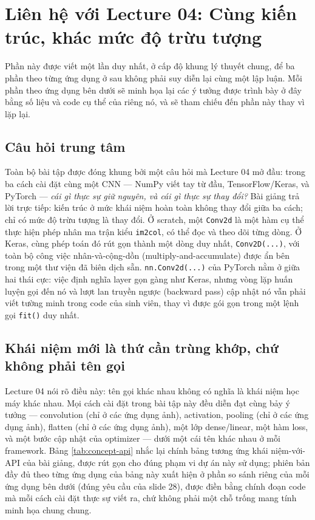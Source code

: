 \documentclass[11pt]{article}
\newcommand{\code}[1]{\texttt{#1}}
\begin{document}
\section{Liên hệ với Lecture 04: Cùng kiến trúc, khác mức độ trừu tượng}
\label{sec:lecture}

Phần này được viết một lần duy nhất, ở cấp độ khung lý thuyết chung, để ba
phần theo từng ứng dụng ở sau không phải suy diễn lại cùng một lập luận.
Mỗi phần theo ứng dụng bên dưới sẽ minh họa lại các ý tưởng được trình bày ở
đây bằng số liệu và code cụ thể của riêng nó, và sẽ tham chiếu đến phần này
thay vì lặp lại.

\subsection{Câu hỏi trung tâm}

Toàn bộ bài tập được đóng khung bởi một câu hỏi mà Lecture 04 mở đầu: trong
ba cách cài đặt cùng một CNN — NumPy viết tay từ đầu, TensorFlow/Keras, và
PyTorch — \textit{cái gì thực sự giữ nguyên, và cái gì thực sự thay đổi?}
Bài giảng trả lời trực tiếp: kiến trúc ở mức khái niệm hoàn toàn không thay
đổi giữa ba cách; chỉ có mức độ trừu tượng là thay đổi. Ở scratch, một
\code{Conv2d} là một hàm cụ thể thực hiện phép nhân ma trận kiểu
\code{im2col}, có thể đọc và theo dõi từng dòng. Ở Keras, cùng phép toán đó
rút gọn thành một dòng duy nhất, \code{Conv2D(...)}, với toàn bộ công việc
nhân-và-cộng-dồn (multiply-and-accumulate) được ẩn bên trong một thư viện
đã biên dịch sẵn. \code{nn.Conv2d(...)} của PyTorch nằm ở giữa hai thái
cực: việc định nghĩa layer gọn gàng như Keras, nhưng vòng lặp huấn luyện
gọi đến nó và lượt lan truyền ngược (backward pass) cập nhật nó vẫn phải
viết tường minh trong code của sinh viên, thay vì được gói gọn trong một
lệnh gọi \code{fit()} duy nhất.

\subsection{Khái niệm mới là thứ cần trùng khớp, chứ không phải tên gọi}

Lecture 04 nói rõ điều này: tên gọi khác nhau không có nghĩa là khái niệm
học máy khác nhau. Mọi cách cài đặt trong bài tập này đều diễn đạt cùng bảy
ý tưởng — convolution (chỉ ở các ứng dụng ảnh), activation, pooling (chỉ ở
các ứng dụng ảnh), flatten (chỉ ở các ứng dụng ảnh), một lớp dense/linear,
một hàm loss, và một bước cập nhật của optimizer — dưới một cái tên khác
nhau ở mỗi framework. Bảng \ref{tab:concept-api} nhắc lại chính bảng tương
ứng khái niệm-với-API của bài giảng, được rút gọn cho đúng phạm vi dự án
này sử dụng; phiên bản đầy đủ theo từng ứng dụng của bảng này xuất hiện ở
phần so sánh riêng của mỗi ứng dụng bên dưới (đúng yêu cầu của slide 28),
được điền bằng chính đoạn code mà mỗi cách cài đặt thực sự viết ra, chứ
không phải một chỗ trống mang tính minh họa chung chung.
\end{document}
